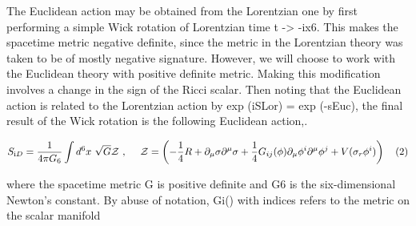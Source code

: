 \documentclass{article}
\begin{document}
The Euclidean action may be obtained from the Lorentzian one by first performing a simple
Wick rotation of Lorentzian time t -> -ix6. This makes the spacetime metric negative definite, since the metric in the Lorentzian theory was taken to be of mostly negative signature.
However, we will choose to work with the Euclidean theory with positive definite metric.
Making this modification involves a change in the sign of the Ricci scalar. Then noting that
the Euclidean action is related to the Lorentzian action by exp (iSLor) = exp (-sEuc), the
final result of the Wick rotation is the following Euclidean action,.


\begin{equation}
S_{\mathrm{i}D}=\frac{1}{4\pi G_{6}}\int d^{6}x~\sqrt{G}{\cal Z}~,~~~~{\cal{Z}}=\left(-\frac{1}{4}R+\partial_{\mu}\sigma\partial^{\mu}\sigma+\frac{1}{4}G_{i j}(\phi)\partial_{\mu}\phi^{i}\partial^{\mu}\phi^{j}+V(\sigma_{r}\phi^{i})\right)~~~(2)
\end{equation}


where the spacetime metric G is positive definite and G6 is the six-dimensional Newton's
constant. By abuse of notation, Gi() with indices refers to the metric on the scalar manifold
\end{document}
